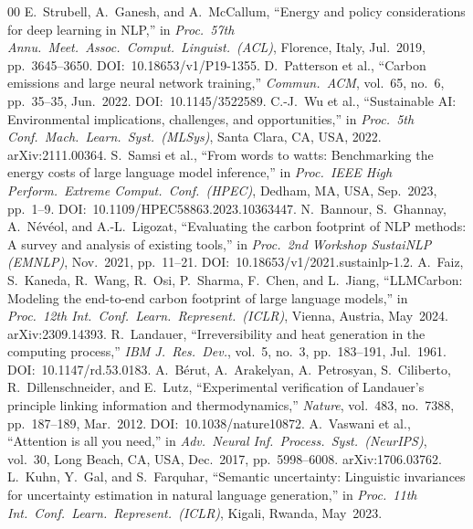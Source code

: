\documentclass[conference]{IEEEtran}
\begin{document}
\begin{thebibliography}{00}
E.~Strubell, A.~Ganesh, and A.~McCallum,
``Energy and policy considerations for deep learning in NLP,''
in \textit{Proc.\ 57th Annu.\ Meet.\ Assoc.\ Comput.\ Linguist.\ (ACL)},
Florence, Italy, Jul.~2019, pp.~3645--3650.
DOI:~10.18653/v1/P19-1355.
D.~Patterson et al.,
``Carbon emissions and large neural network training,''
\textit{Commun.\ ACM}, vol.~65, no.~6, pp.~35--35, Jun.~2022.
DOI:~10.1145/3522589.
C.-J.~Wu et al.,
``Sustainable AI: Environmental implications, challenges,
and opportunities,''
in \textit{Proc.\ 5th Conf.\ Mach.\ Learn.\ Syst.\ (MLSys)},
Santa Clara, CA, USA, 2022.
arXiv:2111.00364.
S.~Samsi et al.,
``From words to watts: Benchmarking the energy costs of large
language model inference,''
in \textit{Proc.\ IEEE High Perform.\ Extreme Comput.\ Conf.\
(HPEC)}, Dedham, MA, USA, Sep.~2023, pp.~1--9.
DOI:~10.1109/HPEC58863.2023.10363447.
N.~Bannour, S.~Ghannay, A.~N\'ev\'eol, and A.-L.~Ligozat,
``Evaluating the carbon footprint of NLP methods: A survey
and analysis of existing tools,''
in \textit{Proc.\ 2nd Workshop SustaiNLP (EMNLP)},
Nov.~2021, pp.~11--21.
DOI:~10.18653/v1/2021.sustainlp-1.2.
A.~Faiz, S.~Kaneda, R.~Wang, R.~Osi, P.~Sharma, F.~Chen, and
L.~Jiang,
``LLMCarbon: Modeling the end-to-end carbon footprint of large
language models,''
in \textit{Proc.\ 12th Int.\ Conf.\ Learn.\ Represent.\ (ICLR)},
Vienna, Austria, May~2024.
arXiv:2309.14393.
R.~Landauer,
``Irreversibility and heat generation in the computing process,''
\textit{IBM J.~Res.\ Dev.}, vol.~5, no.~3,
pp.~183--191, Jul.~1961.
DOI:~10.1147/rd.53.0183.
A.~B\'erut, A.~Arakelyan, A.~Petrosyan, S.~Ciliberto,
R.~Dillenschneider, and E.~Lutz,
``Experimental verification of Landauer's principle linking
information and thermodynamics,''
\textit{Nature}, vol.~483, no.~7388, pp.~187--189, Mar.~2012.
DOI:~10.1038/nature10872.
A.~Vaswani et al.,
``Attention is all you need,''
in \textit{Adv.\ Neural Inf.\ Process.\ Syst.\ (NeurIPS)},
vol.~30, Long Beach, CA, USA, Dec.~2017, pp.~5998--6008.
arXiv:1706.03762.
L.~Kuhn, Y.~Gal, and S.~Farquhar,
``Semantic uncertainty: Linguistic invariances for uncertainty
estimation in natural language generation,''
in \textit{Proc.\ 11th Int.\ Conf.\ Learn.\ Represent.\ (ICLR)},
Kigali, Rwanda, May~2023.

\end{thebibliography}
\end{document}
